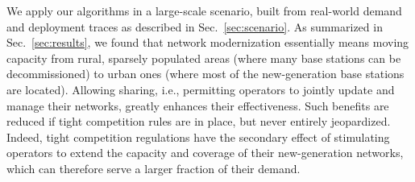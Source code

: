 \documentclass[10pt,journal,cspaper,compsoc]{IEEEtran}
\newcommand{\Sec}[1]{Sec.~\ref{sec:#1}}
\begin{document}
We apply our algorithms in a large-scale scenario, built from real-world demand and deployment
traces as described in \Sec{scenario}. As summarized in \Sec{results},
we found that network
modernization essentially means moving capacity from rural, sparsely populated
areas (where many base stations can be decommissioned)
to urban ones (where most of the new-generation base stations are located).
Allowing sharing, i.e.,
permitting operators to jointly update and manage their networks, greatly enhances their
effectiveness. Such benefits are reduced if tight competition rules are in place, but
never entirely jeopardized.
Indeed, tight competition regulations have the secondary effect of stimulating operators to
extend the capacity and coverage of their new-generation networks,
which can therefore serve a larger fraction of their demand.


\end{document}

